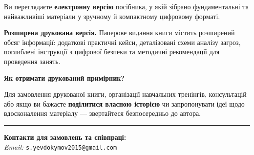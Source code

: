 \vspace{1.5em}

\noindent Ви переглядаєте \textbf{електронну версію} посібника, у якій зібрано фундаментальні та найважливіші матеріали у зручному й компактному цифровому форматі.

\vspace{1em}

\noindent \textbf{Розширена друкована версія.} Паперове видання книги містить розширений обсяг інформації: додаткові практичні кейси, деталізовані схеми аналізу загроз, поглиблені інструкції з цифрової безпеки та методичні рекомендації для проведення занять.

\vspace{2em}

\begin{center}
    \begingroup
    \large
    \textbf{Як отримати друкований примірник?}
    \endgroup
    
    \vspace{0.8em}
    
    \parbox{0.88\textwidth}{
        \centering
        Для замовлення друкованої книги, організації навчальних тренінгів, консультацій або якщо ви бажаєте \textbf{поділитися власною історією} чи запропонувати ідеї щодо вдосконалення матеріалу — звертайтеся безпосередньо до автора.
    }
\end{center}

\vspace{2.5em}

\begin{center}
    \rule{0.35\textwidth}{0.4pt}
\end{center}

\vspace{1.5em}

\begin{center}
    \small
    \textbf{Контакти для замовлень та співпраці:} \\[0.6em]
    \textit{Email:} \texttt{s.yevdokymov2015@gmail.com}
\end{center}

\vfill

\clearpage